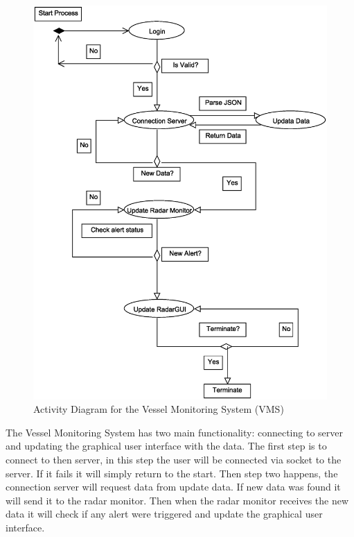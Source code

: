 \documentclass{article}
\begin{document}
\break
\begin{figure}[!htb]
\caption{Activity Diagram for the Vessel Monitoring System (VMS) }
\centering
\includegraphics[scale=0.6]{diagrams/vms-activity-diagram.eps}
\end{figure}
The Vessel Monitoring System has two main functionality: connecting to server and updating the graphical user interface with the data. The first step is to connect to then server, in this step the user will be connected via socket to the server. If it fails it will simply return to the start. Then step two happens, the connection server will request data from update data. If new data was found it will send it to the radar monitor. Then when the radar monitor receives the new data it will check if any alert were triggered and update the graphical user interface.

\break
\end{document}

